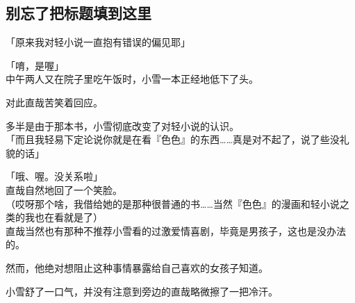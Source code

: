 \subsection{别忘了把标题填到这里}

「原来我对轻小说一直抱有错误的偏见耶」

「唷，是喔」\\

中午两人又在院子里吃午饭时，小雪一本正经地低下了头。

对此直哉苦笑着回应。

多半是由于那本书，小雪彻底改变了对轻小说的认识。\\

「而且我轻易下定论说你就是在看『色色』的东西……真是对不起了，说了些没礼貌的话」

「哦、喔。没关系啦」\\

直哉自然地回了一个笑脸。\\

（哎呀那个啥，我借给她的是那种很普通的书……当然『色色』的漫画和轻小说之类的我也在看就是了）\\

直哉当然也有那种不推荐小雪看的过激爱情喜剧，毕竟是男孩子，这也是没办法的。

然而，他绝对想阻止这种事情暴露给自己喜欢的女孩子知道。

小雪舒了一口气，并没有注意到旁边的直哉略微擦了一把冷汗。\\

